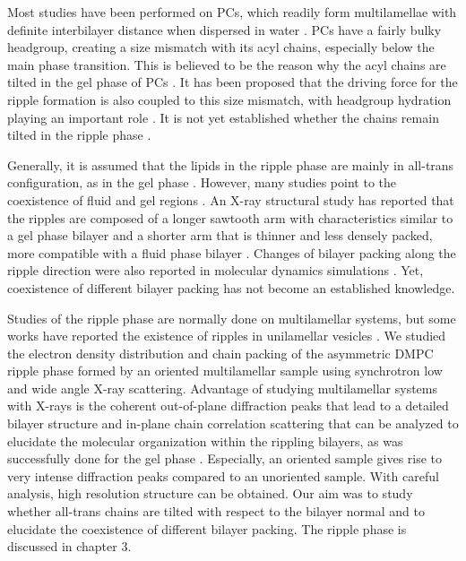 Most studies have been performed on PCs, which readily form multilamellae
with definite interbilayer distance when dispersed in water \cite{Nagle00}.
PCs have a fairly bulky headgroup, creating a size mismatch with its acyl chains,
especially below the main phase transition. This is believed to be the 
reason why the acyl chains are tilted in the gel phase of PCs \cite{Nagle00,ref:Mcintosh80}.
It has been proposed that the driving force for the ripple formation is also 
coupled to this size mismatch, with headgroup hydration playing an important role
\cite{ref:Cevc91,ref:Carlson87}.
It is not yet established whether the chains remain tilted in the ripple phase \cite{ref:Sun96}.

Generally, it is assumed that the lipids in the ripple phase are mainly in all-trans
configuration, as in the gel phase \cite{ref:Sengupta03}.
However, many studies point to the coexistence of fluid and gel regions
\cite{ref:Wittebort81,ref:Schneider83,ref:Sun96,ref:Marsh80,ref:Cunningham98,ref:Rappolt00}.
An X-ray structural study has reported that the ripples are composed of 
a longer sawtooth arm with characteristics similar to a gel phase bilayer 
and a shorter arm that is thinner and less densely packed, more compatible with
a fluid phase bilayer \cite{ref:Sun96}.
Changes of bilayer packing along the ripple direction were also reported in
molecular dynamics simulations \cite{ref:deVries05}.
Yet, coexistence of different bilayer packing has not become an established knowledge.
 
Studies of the ripple phase are normally done on multilamellar systems, but
some works have reported the existence of ripples in unilamellar vesicles
\cite{ref:Mason99,ref:Parente84}.
We studied the electron density distribution and chain packing 
of the asymmetric DMPC ripple phase formed by an oriented multilamellar sample
using synchrotron low and wide angle X-ray scattering.
Advantage of studying multilamellar systems with X-rays 
is the coherent out-of-plane diffraction peaks that lead to a detailed
bilayer structure \cite{ref:Sun96} and in-plane chain correlation scattering 
that can be analyzed to elucidate the molecular organization within 
the rippling bilayers, as was successfully done for the gel phase 
\cite{ref:Tardieu73,ref:Smith88,ref:Tristram93}.
Especially, an oriented sample gives rise to very intense diffraction peaks
compared to an unoriented sample. With careful analysis, high resolution
structure can be obtained.
Our aim was to study whether all-trans chains are tilted with respect to 
the bilayer normal and to elucidate the coexistence of different bilayer packing.
The ripple phase is discussed in chapter 3. 

